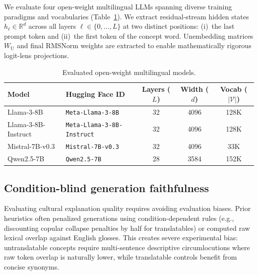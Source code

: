 \documentclass{article}
\begin{document}
We evaluate four open-weight multilingual LLMs spanning diverse training paradigms and vocabularies (Table~\ref{tab:models}). We extract residual-stream hidden states $h_\ell \in \mathbb{R}^d$ across all layers $\ell \in \{0, \dots, L\}$ at two distinct positions: (i)~the last prompt token and (ii)~the first token of the concept word. Unembedding matrices $W_{\mathrm{U}}$ and final RMSNorm weights are extracted to enable mathematically rigorous logit-lens projections.

\begin{table}[t]
\centering
\footnotesize
\setlength{\tabcolsep}{6pt}
\begin{tabular}{llccc}
\toprule
Model & Hugging Face ID & Layers ($L$) & Width ($d$) & Vocab ($|\mathcal{V}|$) \\
\midrule
Llama-3-8B & \texttt{Meta-Llama-3-8B} & 32 & 4096 & 128K \\
Llama-3-8B-Instruct & \texttt{Meta-Llama-3-8B-Instruct} & 32 & 4096 & 128K \\
Mistral-7B-v0.3 & \texttt{Mistral-7B-v0.3} & 32 & 4096 & 33K \\
Qwen2.5-7B & \texttt{Qwen2.5-7B} & 28 & 3584 & 152K \\
\bottomrule
\end{tabular}
\vspace{1ex}
\caption{Evaluated open-weight multilingual models.}
\label{tab:models}
\end{table}

\subsection{Condition-blind generation faithfulness}
\label{sec:faithfulness_metric}

Evaluating cultural explanation quality requires avoiding evaluation biases. Prior heuristics often penalized generations using condition-dependent rules (e.g., discounting copular collapse penalties by half for translatables) or computed raw lexical overlap against English glosses. This creates severe experimental bias: untranslatable concepts require multi-sentence descriptive circumlocutions where raw token overlap is naturally lower, while translatable controls benefit from concise synonyms.
\end{document}
